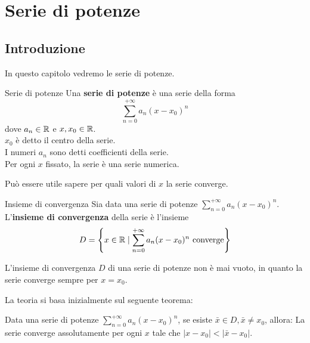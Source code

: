 
\chapter{Serie di potenze}
\section{Introduzione}
In questo capitolo vedremo le serie di potenze.
\begin{definizione}{Serie di potenze}
    Una \textbf{serie di potenze} è una serie della forma
    \[
        \sum_{n=0}^{+\infty} a_n (x-x_0)^n
    \]
    dove $a_n \in \mathbb{R}$ e $x,x_0 \in \mathbb{R}$.\\
    $x_0$ è detto il centro della serie.\\
    I numeri $a_n$ sono detti coefficienti della serie.\\
    Per ogni $x$ fissato, la serie è una serie numerica.
\end{definizione}

Può essere utile sapere per quali valori di $x$ la serie converge.\\

\begin{definizione}{Insieme di convergenza}
    Sia data una serie di potenze $\sum_{n=0}^{+\infty} a_n (x-x_0)^n$.\\
    L'\textbf{insieme di convergenza} della serie è l'insieme
    \[
        D=\left\{ x \in \mathbb{R} \mid \sum_{n=0}^{+\infty} a_n (x-x_0)^n \text{ converge} \right\}
    \]
\end{definizione}

\begin{osservazione}{}
    L'insieme di convergenza $D$ di una serie di potenze non è mai vuoto, in quanto la serie converge sempre per $x=x_0$.
\end{osservazione}


La teoria si basa inizialmente sul seguente teorema:
\begin{teorema}{}
  Data una serie di potenze $\sum_{n=0}^{+\infty} a_n (x-x_0)^n$, se esiste $\bar{x} \in D, \bar{x}\neq x_0$, allora:
  La serie converge assolutamente per ogni $x$ tale che $\lvert x - x_0 \rvert < \lvert \bar{x} - x_0 \rvert$.\\
\end{teorema}

